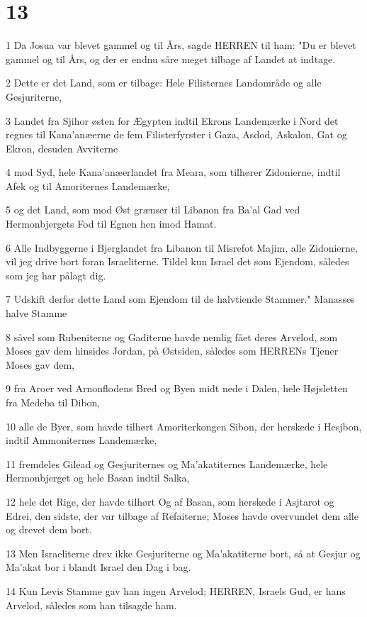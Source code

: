 \chapter{13}

\par 1 Da Josua var blevet gammel og til Års, sagde HERREN til ham: "Du er blevet gammel og til Års, og der er endnu såre meget tilbage af Landet at indtage.
\par 2 Dette er det Land, som er tilbage: Hele Filisternes Landområde og alle Gesjuriterne,
\par 3 Landet fra Sjihor østen for Ægypten indtil Ekrons Landemærke i Nord det regnes til Kana'anæerne de fem Filisterfyrster i Gaza, Asdod, Askalon, Gat og Ekron, desuden Avviterne
\par 4 mod Syd, hele Kana'anæerlandet fra Meara, som tilhører Zidonierne, indtil Afek og til Amoriternes Landemærke,
\par 5 og det Land, som mod Øst grænser til Libanon fra Ba'al Gad ved Hermonbjergets Fod til Egnen hen imod Hamat.
\par 6 Alle Indbyggerne i Bjerglandet fra Libanon til Misrefot Majim, alle Zidonierne, vil jeg drive bort foran Israeliterne. Tildel kun Israel det som Ejendom, således som jeg har pålagt dig.
\par 7 Udskift derfor dette Land som Ejendom til de halvtiende Stammer." Manasses halve Stamme
\par 8 såvel som Rubeniterne og Gaditerne havde nemlig fået deres Arvelod, som Moses gav dem hinsides Jordan, på Østsiden, således som HERRENs Tjener Moses gav dem,
\par 9 fra Aroer ved Arnonflodens Bred og Byen midt nede i Dalen, hele Højsletten fra Medeba til Dibon,
\par 10 alle de Byer, som havde tilhørt Amoriterkongen Sibon, der herskede i Hesjbon, indtil Ammoniternes Landemærke,
\par 11 fremdeles Gilead og Gesjuriternes og Ma'akatiternes Landemærke, hele Hermonbjerget og hele Basan indtil Salka,
\par 12 hele det Rige, der havde tilhørt Og af Basan, som herskede i Asjtarot og Edrei, den sidste, der var tilbage af Refaiterne; Moses havde overvundet dem alle og drevet dem bort.
\par 13 Men Israeliterne drev ikke Gesjuriterne og Ma'akatiterne bort, så at Gesjur og Ma'akat bor i blandt Israel den Dag i bag.
\par 14 Kun Levis Stamme gav han ingen Arvelod; HERREN, Israels Gud, er hans Arvelod, således som han tilsagde ham.
